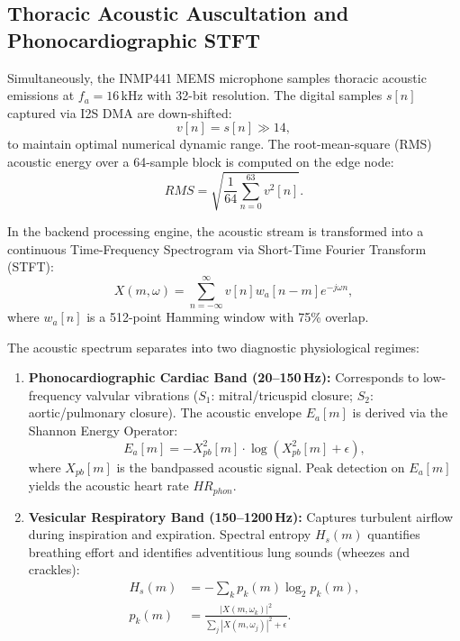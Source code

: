 \documentclass[journal]{IEEEtran}
\begin{document}
\subsection{Thoracic Acoustic Auscultation and Phonocardiographic STFT}

Simultaneously, the INMP441 MEMS microphone samples thoracic acoustic emissions at $f_a = 16$\,kHz with 32-bit resolution. The digital samples $s[n]$ captured via I2S DMA are down-shifted:
\begin{equation}
    v[n] = s[n] \gg 14,
\end{equation}
to maintain optimal numerical dynamic range. The root-mean-square (RMS) acoustic energy over a 64-sample block is computed on the edge node:
\begin{equation}
    RMS = \sqrt{\frac{1}{64} \sum_{n=0}^{63} v^2[n]}.
    \label{eq:rms}
\end{equation}

In the backend processing engine, the acoustic stream is transformed into a continuous Time-Frequency Spectrogram via Short-Time Fourier Transform (STFT):
\begin{equation}
    X(m, \omega) = \sum_{n=-\infty}^{\infty} v[n] w_a[n - m] e^{-j \omega n},
    \label{eq:stft}
\end{equation}
where $w_a[n]$ is a 512-point Hamming window with 75\% overlap.

The acoustic spectrum separates into two diagnostic physiological regimes:
\begin{enumerate}
    \item \textbf{Phonocardiographic Cardiac Band (20--150\,Hz):} Corresponds to low-frequency valvular vibrations ($S_1$: mitral/tricuspid closure; $S_2$: aortic/pulmonary closure). The acoustic envelope $E_a[m]$ is derived via the Shannon Energy Operator:
    \begin{equation}
        E_a[m] = - X_{pb}^2[m] \cdot \log\left( X_{pb}^2[m] + \epsilon \right),
    \end{equation}
    where $X_{pb}[m]$ is the bandpassed acoustic signal. Peak detection on $E_a[m]$ yields the acoustic heart rate $HR_{phon}$.
    \item \textbf{Vesicular Respiratory Band (150--1200\,Hz):} Captures turbulent airflow during inspiration and expiration. Spectral entropy $H_s(m)$ quantifies breathing effort and identifies adventitious lung sounds (wheezes and crackles):
    \begin{align}
        H_s(m) &= - \sum_{k} p_k(m) \log_2 p_k(m), \\
        p_k(m) &= \frac{|X(m, \omega_k)|^2}{\sum_j |X(m, \omega_j)|^2 + \epsilon}.
    \end{align}
\end{enumerate}
\end{document}
